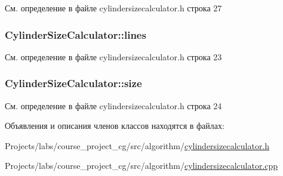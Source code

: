 См. определение в файле cylindersizecalculator.\+h строка 27

\subsubsection[{\texorpdfstring{lines}{lines}}]{ Cylinder\+Size\+Calculator\+::lines\hspace{0.3cm}{\ttfamily [private]}}\hypertarget{class_cylinder_size_calculator_a8a329c2526e67545603769c720d76692}{}\label{class_cylinder_size_calculator_a8a329c2526e67545603769c720d76692}


См. определение в файле cylindersizecalculator.\+h строка 23

\subsubsection[{\texorpdfstring{size}{size}}]{ Cylinder\+Size\+Calculator\+::size\hspace{0.3cm}{\ttfamily [private]}}\hypertarget{class_cylinder_size_calculator_a13af96a82c344f22f3d2749d4dafa15c}{}\label{class_cylinder_size_calculator_a13af96a82c344f22f3d2749d4dafa15c}


См. определение в файле cylindersizecalculator.\+h строка 24



Объявления и описания членов классов находятся в файлах\+:\begin{DoxyCompactItemize}
\item 
Projects/labs/course\+\_\+project\+\_\+cg/src/algorithm/\hyperlink{cylindersizecalculator_8h}{cylindersizecalculator.\+h}\item 
Projects/labs/course\+\_\+project\+\_\+cg/src/algorithm/\hyperlink{cylindersizecalculator_8cpp}{cylindersizecalculator.\+cpp}\end{DoxyCompactItemize}
